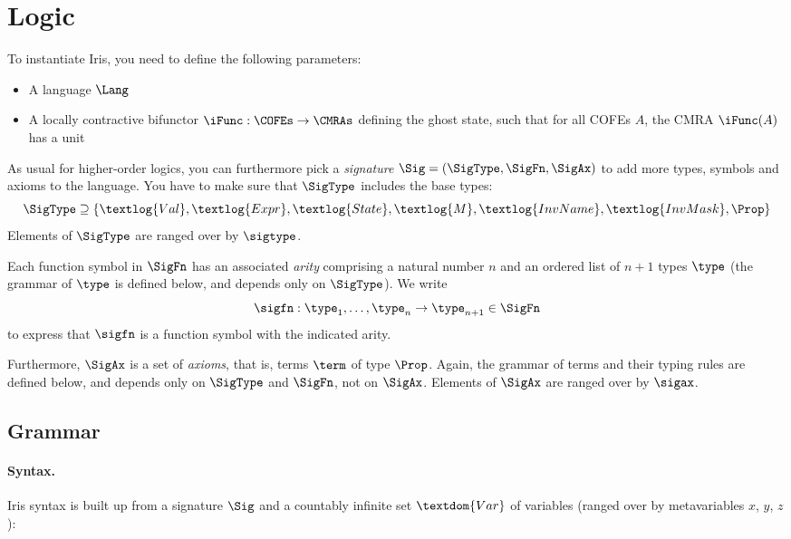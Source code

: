 \clearpage
\section{Logic}

To instantiate Iris, you need to define the following parameters:
\begin{itemize}
\item A language $\Lang$
\item A locally contractive bifunctor $\iFunc : \COFEs \to \CMRAs$ defining the ghost state, such that for all COFEs $A$, the CMRA $\iFunc(A)$ has a unit
\end{itemize}

\noindent
As usual for higher-order logics, you can furthermore pick a \emph{signature} $\Sig = (\SigType, \SigFn, \SigAx)$ to add more types, symbols and axioms to the language.
You have to make sure that $\SigType$ includes the base types:
\[
	\SigType \supseteq \{ \textlog{Val}, \textlog{Expr}, \textlog{State}, \textlog{M}, \textlog{InvName}, \textlog{InvMask}, \Prop \}
\]
Elements of $\SigType$ are ranged over by $\sigtype$.

Each function symbol in $\SigFn$ has an associated \emph{arity} comprising a natural number $n$ and an ordered list of $n+1$ types $\type$ (the grammar of $\type$ is defined below, and depends only on $\SigType$).
We write
\[
	\sigfn : \type_1, \dots, \type_n \to \type_{n+1} \in \SigFn
\]
to express that $\sigfn$ is a function symbol with the indicated arity.

Furthermore, $\SigAx$ is a set of \emph{axioms}, that is, terms $\term$ of type $\Prop$.
Again, the grammar of terms and their typing rules are defined below, and depends only on $\SigType$ and $\SigFn$, not on $\SigAx$.
Elements of $\SigAx$ are ranged over by $\sigax$.

\subsection{Grammar}\label{sec:grammar}

\paragraph{Syntax.}
Iris syntax is built up from a signature $\Sig$ and a countably infinite set $\textdom{Var}$ of variables (ranged over by metavariables $x$, $y$, $z$):

